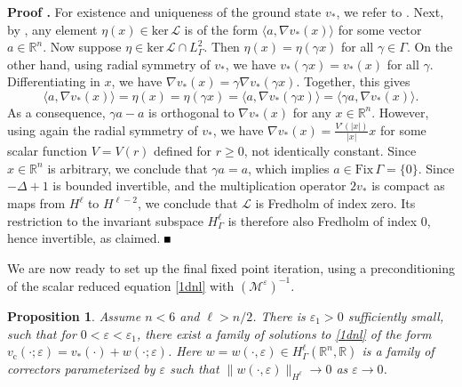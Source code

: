 \documentclass[10pt]{article}
\newtheorem{Proposition}[Lemma]{Proposition}
\newenvironment{Proof}[1][\unskip]%
 {\begin{trivlist} \item[]{\bf Proof #1. }}%
 {\hspace*{\fill}$\rule{.4\baselineskip}{.4\baselineskip}$\end{trivlist}}
\newcommand{\R}{\mathbb{R}}
\newcommand{\Ns}{\mathrm{ker\,}}
\newcommand{\eps}{\varepsilon}
\newcommand{\cL}{\mathcal{L}}
\newcommand{\M}{\mathcal{M}}
\begin{document}
\begin{Proof} 
For existence and uniqueness of the ground state $v_*$, we refer to \cite[Lem. 13.3]{gs}. Next, by \cite[Lem. 13.4]{gs}, any element $\eta(x) \in \Ns \cL$ is of the form $\langle a, \nabla v_*(x)\rangle$ for some vector $a \in \R^n$. Now suppose $\eta \in \Ns \cL \cap L^2_{\Gamma}$. Then  $\eta(x) = \eta(\gamma x)$ for all $\gamma \in \Gamma$.
On the other hand, using radial symmetry of $v_*$, we have $v_*(\gamma x) ={v_*(x)}$ for all $\gamma$.  Differentiating in $x$, we have $\nabla v_* (x) = \gamma \nabla v_* (\gamma x)$. Together, this gives
\[
\langle a,\nabla v_*(x) \rangle = \eta(x) = \eta(\gamma x) = \langle a, \nabla v_* (\gamma x)\rangle = \langle  \gamma a, \nabla v_*(x)\rangle. 
\]
As a consequence,  $\gamma a - a$ is orthogonal to $\nabla v_*(x)$ for any $x \in \R^n$. However, using again the radial symmetry of $v_*$, we have $\nabla v_*(x)  = \frac{V'(|x|)}{|x|} x$ for some scalar function $V=V(r)$ defined for $r\ge 0$, not identically constant. Since $x \in \R^n$ is arbitrary, we conclude that $\gamma a =a$, which implies $a \in \mathrm{Fix}\,\Gamma = \{0\}$. Since ${-\Delta} +1$ is bounded invertible, and the multiplication operator $2v_*$ is compact as  maps from $H^\ell$ to $H^{\ell-2}$, we conclude that $\cL$ is Fredholm of index zero. Its restriction to the invariant subspace $H^\ell_\Gamma$ is therefore also Fredholm of index 0, hence invertible, as claimed. 
\end{Proof}

We are now ready to  set up the final fixed point iteration, using a preconditioning of the scalar reduced equation \eqref{1dnl} with $(\M^\eps)^{-1}$. 
\begin{Proposition}\label{prop} Assume $n<6$ and $\ell>n/2$. There is $\eps_1>0$ sufficiently small, such that for $0<\eps <\eps_1$, there exist a family of solutions to \eqref{1dnl} of the form $v_\mathrm{c}(\cdot;\eps) = v_*(\cdot)+w(\cdot; \eps)$. Here $w=w(\cdot,\eps) \in H^{\ell}_{\Gamma}(\R^n,\R)$ is a family of correctors parameterized by $\eps $ such that $\|w(\cdot,\eps)\|_{H^\ell} \to 0$ as $\eps \to 0$.
\end{Proposition}

\end{document}
